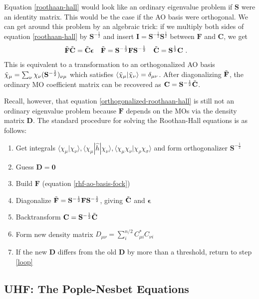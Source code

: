 \documentclass[11pt,fleqn]{article}
\renewcommand{\d}{\delta}    %
\newcommand{\ev}{\epsilon}   %
\newcommand{\si}{\sigma}     %
\newcommand{\x}{\chi}        %
\newcommand{\tl}{\ensuremath{\tilde}}
\newcommand{\op}[1]{\ensuremath{\hat{#1}}}
\newcommand{\bo}[1]{\ensuremath{\mathbf{#1}}}
\newcommand{\ip}[1]{\ensuremath{\langle#1\rangle}}
\theoremstyle{mystyle}
\begin{document}
Equation \ref{roothaan-hall} would look like an ordinary eigenvalue problem if $\bo{S}$ were an identity matrix.
This would be the case if the AO basis were orthogonal.
We can get around this problem by an algebraic trick:
if we multiply both sides of equation \ref{roothaan-hall} by $\bo{S}^{-\frac{1}{2}}$ and insert $\bo{I}=\bo{S}^{-\frac{1}{2}}\bo{S}^{\frac{1}{2}}$ between $\bo{F}$ and $\bo{C}$, we get
\begin{align}
\label{orthogonalized-roothaan-hall}
&
  \tl{\bo{F}}
  \tl{\bo{C}}
=
  \tl{\bo{C}}\bm\ev
&&
  \tl{\bo{F}}
=
  \bo{S}^{-\frac{1}{2}}\bo{F}\bo{S}^{-\frac{1}{2}}
&&
  \tl{\bo{C}}
=
  \bo{S}^{\frac{1}{2}}\bo{C}\ .
\end{align}
This is equivalent to a transformation to an orthogonalized AO basis $\tl\x_\mu=\sum_\nu\x_\nu (\bo{S}^{-\frac{1}{2}})_{\nu\mu}$ which satisfies $\ip{\tl\x_\mu|\tl\x_\nu}=\d_{\mu\nu}$.
After diagonalizing $\tl{\bo{F}}$, the ordinary MO coefficient matrix can be recovered as $\bo{C}=\bo{S}^{-\frac{1}{2}}\tl{\bo{C}}$.

Recall, however, that equation \ref{orthogonalized-roothaan-hall} is still not an ordinary eigenvalue problem because $\bo{F}$ depends on the MOs via the density matrix $\bo{D}$.
The standard procedure for solving the Roothan-Hall equations is as follows:
\begin{enumerate}
  \item Get integrals $\ip{\x_\mu|\x_\nu}, \ip{\x_\mu|\op{h}|\x_\nu}, \ip{\x_\mu\x_\nu|\x_\rho\x_\si}$ and form orthogonalizer $\bo{S}^{-\frac{1}{2}}$
  \item Guess $\bo{D}=\bo{0}$
  \item\label{loop} Build $\bo{F}$ (equation \ref{rhf-ao-basis-fock})
  \item Diagonalize $\tl{\bo{F}}=\bo{S}^{-\frac{1}{2}}\bo{F}\bo{S}^{-\frac{1}{2}}$, giving $\tl{\bo{C}}$ and $\bm\ev$
  \item Backtransform $\bo{C}=\bo{S}^{-\frac{1}{2}}\tl{\bo{C}}$
  \item Form new density matrix $D_{\mu\nu}=\sum_i^{n/2} C_{\mu i}^*C_{\nu i}$
  \item If the new $\bo{D}$ differs from the old $\bo{D}$ by more than a threshold, return to step \ref{loop}
\end{enumerate}


\subsection*{UHF: The Pople-Nesbet Equations}
\end{document}
